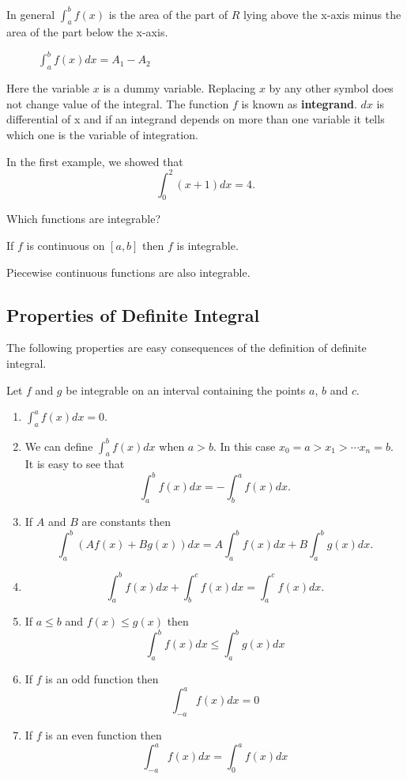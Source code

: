 \documentclass[../main.tex]{subfiles}
\begin{document}
In general $\int_a^b f(x)$ is the area of the part of $R$ lying above the x-axis minus the area of the part below the x-axis.

\begin{figure}[H]
  \centering
  
  \caption{ $\int_a^b f(x) dx = A_1 - A_2$}
\end{figure}

Here the variable $x$ is a dummy variable. Replacing $x$ by any other symbol does not change value of the integral. The function $f$ is known as \textbf{integrand}. $dx$ is differential of x and  if an integrand depends on more than one variable it tells which one is the variable of integration.

In the first example, we showed that
\[
  \int_0^2 (x+1) dx = 4.
\]

Which functions are integrable?
\begin{theorem}
  If $f$ is continuous on $[a, b]$ then $f$ is integrable.
\end{theorem}
Piecewise continuous functions are also integrable.

\subsection*{Properties of Definite Integral}
The following properties are easy consequences of the definition of definite integral.
\begin{theorem}
  Let $f$ and $g$ be integrable on an interval containing the points $a$, $b$ and $c$.
  \begin{enumerate}
    \item $\int_a^a f(x) dx = 0$.
    \item We can define $\int_a^b f(x) dx$ when $a>b$. In this case $x_0 = a > x_1 > \cdots x_n = b$. It is easy to see that
    \[
      \int_a^b f(x) dx = - \int_b^a f(x) dx.
    \]
    \item If $A$ and $B$ are constants then
    \[
      \int_a^b (A f(x) + B g(x)) dx =
      A \int_a^b f(x)dx + B \int_a^b g(x)dx.
    \]
    \item
    \[
      \int_a^b f(x) dx + \int_b^c f(x) dx =
      \int_a^c f(x) dx.
    \]
    \item If $a \le b$ and $f(x) \le g(x)$ then
    \[
      \int_a^b f(x) dx \le \int_a^b g(x) dx
    \]
    \item If $f$ is an odd function then
    \[
      \int_{-a}^a f(x) dx = 0
    \]
    \item If $f$ is an even function then
    \[
      \int_{-a}^a f(x) dx = \int_0^a f(x) dx
    \]
  \end{enumerate}
\end{theorem}
\end{document}
